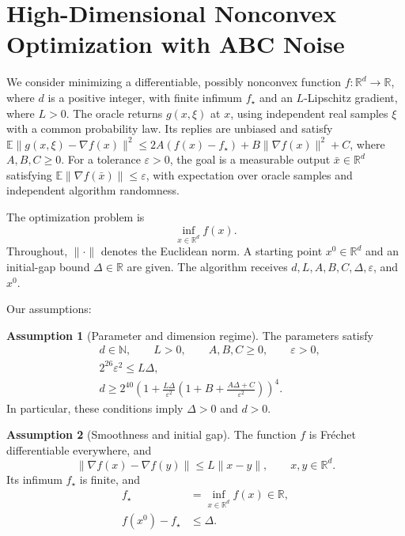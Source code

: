 \documentclass[10pt]{article}
\theoremstyle{definition}
\newtheorem{assumption}{Assumption}
\begin{document}
\section*{High-Dimensional Nonconvex Optimization with ABC Noise}
We consider minimizing a differentiable, possibly nonconvex function $f:\mathbb{R}^d\to\mathbb{R}$, where $d$ is a positive integer, with finite infimum $f_\star$ and an $L$-Lipschitz gradient, where $L>0$. The oracle returns $g(x,\xi)$ at $x$, using independent real samples $\xi$ with a common probability law. Its replies are unbiased and satisfy $\mathbb{E}\|g(x,\xi)-\nabla f(x)\|^2\leq 2A(f(x)-f_\star)+B\|\nabla f(x)\|^2+C$, where $A,B,C\geq0$. For a tolerance $\varepsilon>0$, the goal is a measurable output $\bar{x}\in\mathbb{R}^d$ satisfying $\mathbb{E}\|\nabla f(\bar{x})\|\leq\varepsilon$, with expectation over oracle samples and independent algorithm randomness.

The optimization problem is
\[
\inf_{x\in\mathbb{R}^d} f(x).
\]
Throughout, $\|\cdot\|$ denotes the Euclidean norm. A starting point $x^0\in\mathbb{R}^d$ and an initial-gap bound $\Delta\in\mathbb{R}$ are given. The algorithm receives $d,L,A,B,C,\Delta,\varepsilon$, and $x^0$.

Our assumptions:
\begin{assumption}[Parameter and dimension regime]
The parameters satisfy
\[
\begin{aligned}
&d\in\mathbb{N},\qquad L>0,\qquad A,B,C\geq0,\qquad \varepsilon>0,\\
&2^{26}\varepsilon^2\leq L\Delta,\\
&d\geq 2^{40}\left(1+\frac{L\Delta}{\varepsilon^2}
\left(1+B+\frac{A\Delta+C}{\varepsilon^2}\right)\right)^4.
\end{aligned}
\]
In particular, these conditions imply $\Delta>0$ and $d>0$.
\end{assumption}

\begin{assumption}[Smoothness and initial gap]
The function $f$ is Fr\'echet differentiable everywhere, and
\[
\|\nabla f(x)-\nabla f(y)\|\leq L\|x-y\|,
\qquad x,y\in\mathbb{R}^d.
\]
Its infimum $f_\star$ is finite, and
\[
\begin{aligned}
f_\star&=\inf_{x\in\mathbb{R}^d}f(x)\in\mathbb{R},\\
f(x^0)-f_\star&\leq\Delta.
\end{aligned}
\]
\end{assumption}
\end{document}

